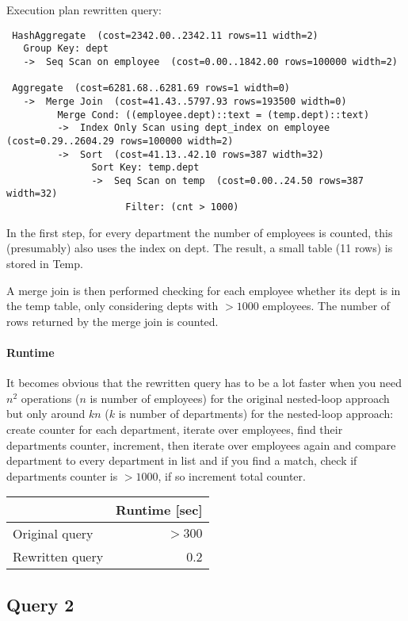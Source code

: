 \documentclass[11pt]{scrartcl}
\begin{document}
Execution plan rewritten query:

\begin{verbatim}
 HashAggregate  (cost=2342.00..2342.11 rows=11 width=2)
   Group Key: dept
   ->  Seq Scan on employee  (cost=0.00..1842.00 rows=100000 width=2)

 Aggregate  (cost=6281.68..6281.69 rows=1 width=0)
   ->  Merge Join  (cost=41.43..5797.93 rows=193500 width=0)
         Merge Cond: ((employee.dept)::text = (temp.dept)::text)
         ->  Index Only Scan using dept_index on employee  (cost=0.29..2604.29 rows=100000 width=2)
         ->  Sort  (cost=41.13..42.10 rows=387 width=32)
               Sort Key: temp.dept
               ->  Seq Scan on temp  (cost=0.00..24.50 rows=387 width=32)
                     Filter: (cnt > 1000)
\end{verbatim}

In the first step, for every department the number of employees is counted,
this (presumably) also uses the index on dept. The result, a small table (11 rows)
is stored in Temp.

A merge join is then performed checking for each employee whether its dept
is in the temp table, only considering depts with $>1000$ employees. The number
of rows returned by the merge join is counted.


\paragraph{Runtime} It becomes obvious that the rewritten query has to
be a lot faster when you need $n^2$ operations ($n$ is number of employees)
for the original nested-loop
approach but only around $kn$ ($k$ is number of departments) for the nested-loop
approach: create counter for each department, iterate over employees,
find their departments counter, increment,
then iterate over employees again and compare department to every department in list
and if you find a match, check if departments counter is $>1000$,
if so increment total counter.


\begin{table}[H]
  \begin{tabular}{l|r}
    & Runtime [sec] \\
   \hline
    Original query & $>300$\\
    Rewritten query & 0.2\\
  \end{tabular}
\end{table}

\subsection*{Query 2}
\end{document}
